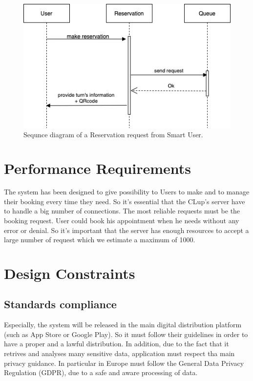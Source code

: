 \begin{figure}[H]
  \caption{Sequnce diagram of a Reservation request from Smart User.}
  \label{fig:SD_reservation}
  \centering
  \includegraphics[scale=0.45]{diagrams/SD_reservation.png}

\end{figure}



\section{Performance Requirements}
The system has been designed to give possibility to Users to make and to manage their booking every time they need. So it's essential that the CLup's server have to handle a big number of connections. The most reliable requests must be the booking request. User could book his appointment when he needs without any error or denial. So it's important that the server has enough resources to accept a large number of request which we estimate a maximum of 1000.




\section{Design Constraints}
\subsection{Standards compliance}
Especially, the system will be released in the main digital distribution platform (such as App Store or Google Play). So it must follow their guidelines in order to have a proper and a lawful distribution. In addition, due to the fact that it retrives and analyses many sensitive data, application must respect tha main privacy guidance. In particular in Europe must follow the General Data Privacy Regulation (GDPR), due to a safe and aware processing of data. 
